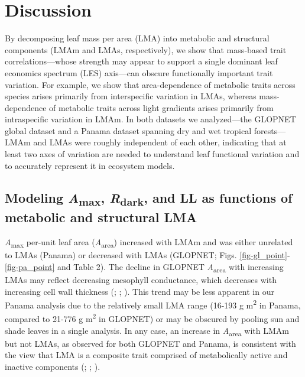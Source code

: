 \documentclass[
  12pt,
  letterpaper,
  DIV=11,
  numbers=noendperiod]{scrartcl}
\begin{document}
\section{Discussion}\label{discussion}

By decomposing leaf mass per area (LMA) into metabolic and structural
components (LMAm and LMAs, respectively), we show that mass‐based trait
correlations---whose strength may appear to support a single dominant
leaf economics spectrum (LES) axis---can obscure functionally important
trait variation. For example, we show that area-dependence of metabolic
traits across species arises primarily from interspecific variation in
LMAs, whereas mass-dependence of metabolic traits across light gradients
arises primarily from intraspecific variation in LMAm. In both datasets
we analyzed---the GLOPNET global dataset and a Panama dataset spanning
dry and wet tropical forests---LMAm and LMAs were roughly independent of
each other, indicating that at least two axes of variation are needed to
understand leaf functional variation and to accurately represent it in
ecosystem models.　

\subsection{\texorpdfstring{Modeling \emph{A}\textsubscript{max},
\emph{R}\textsubscript{dark}, and LL as functions of metabolic and
structural
LMA}{Modeling Amax, Rdark, and LL as functions of metabolic and structural LMA}}\label{modeling-amax-rdark-and-ll-as-functions-of-metabolic-and-structural-lma}

\emph{A}\textsubscript{max} per-unit leaf area
(\emph{A}\textsubscript{area}) increased with LMAm and was either
unrelated to LMAs (Panama) or decreased with LMAs (GLOPNET; Figs.
\ref{fig-gl_point}-\ref{fig-pa_point} and Table 2). The decline in
GLOPNET \emph{A}\textsubscript{area} with increasing LMAs may reflect
decreasing mesophyll conductance, which decreases with increasing cell
wall thickness (;
;
). This trend may be less
apparent in our Panama analysis due to the relatively small LMA range
(16-193 g m\textsuperscript{2} in Panama, compared to 21-776 g
m\textsuperscript{2} in GLOPNET) or may be obscured by pooling sun and
shade leaves in a single analysis. In any case, an increase in
\emph{A}\textsubscript{area} with LMAm but not LMAs, as observed for
both GLOPNET and Panama, is consistent with the view that LMA is a
composite trait comprised of metabolically active and inactive
components (;
;
).
\end{document}
